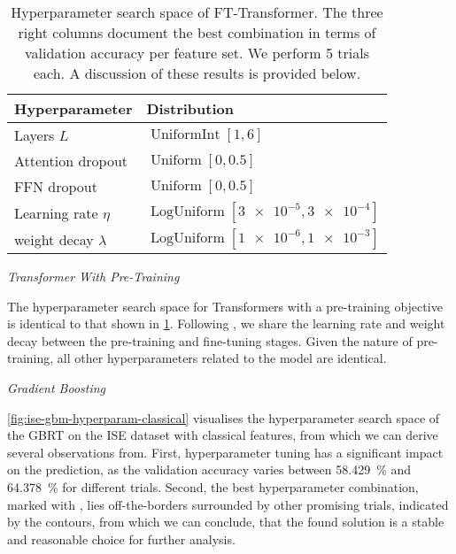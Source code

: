 \begin{table}[H]
    \centering
    \caption[Hyperparameter Search Space of FT-Transformer]{Hyperparameter search space of FT-Transformer. The three right columns document the best combination in terms of validation accuracy per feature set. We perform \num{5} trials each. A discussion of these results is provided below.}
    \label{tab:hyperparameter-space-2}
    \begin{tabular}{@{}ll@{}}
        \toprule
        Hyperparameter         & Distribution                                        \\ \midrule
        Layers $L$             & $\operatorname{UniformInt}[1,6]$                    \\
        Attention dropout      & $\operatorname{Uniform}[0, 0.5]$                    \\
        \gls{FFN} dropout      & $\operatorname{Uniform}[0, 0.5]$                    \\
        Learning rate $\eta$   & $\operatorname{LogUniform}[\num{3e-5}, \num{3e-4}]$ \\
        weight decay $\lambda$ & $\operatorname{LogUniform}[\num{1e-6}, \num{1e-3}]$ \\ \bottomrule
    \end{tabular}
\end{table}

\emph{Transformer With Pre-Training}

The hyperparameter search space for Transformers with a pre-training objective is identical to that shown in \cref{tab:hyperparameter-space-2}. Following \textcite[][4]{rubachevRevisitingPretrainingObjectives2022}, we share the learning rate and weight decay between the pre-training and fine-tuning stages. Given the nature of pre-training, all other hyperparameters related to the model are identical.


\emph{Gradient Boosting}

\cref{fig:ise-gbm-hyperparam-classical} visualises the hyperparameter search space of the \gls{GBRT} on the \gls{ISE} dataset with classical features, from which we can derive several observations from. First, hyperparameter tuning has a significant impact on the prediction, as the validation accuracy varies between \SI{58.429}{\percent} and \SI{64.378}{\percent} for different trials. Second, the best hyperparameter combination, marked with \bestcircle, lies off-the-borders surrounded by other promising trials, indicated by the contours, from which we can conclude, that the found solution is a stable and reasonable choice for further analysis.


